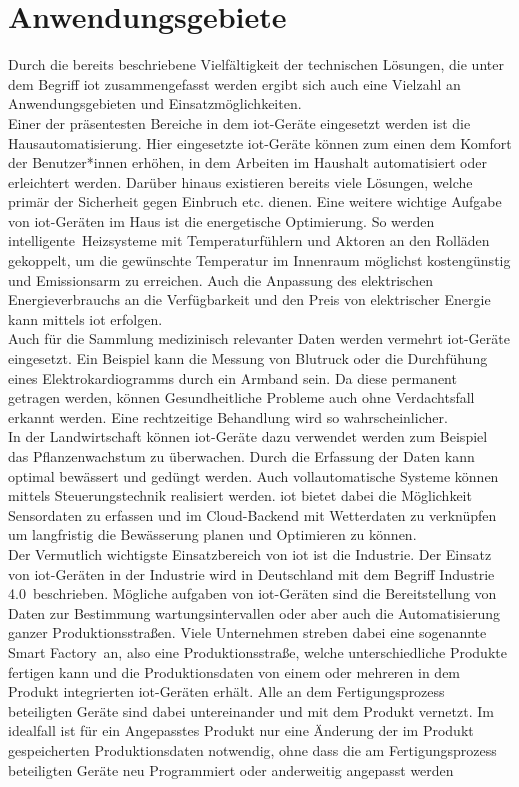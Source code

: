 \section{Anwendungsgebiete}\label{sec:3.2}
Durch die bereits beschriebene Vielfältigkeit der technischen Lösungen, die unter dem Begriff \acrshort{iot} zusammengefasst werden ergibt sich auch eine Vielzahl an Anwendungsgebieten und Einsatzmöglichkeiten.\\ Einer der präsentesten Bereiche in dem \acrshort{iot}-Geräte eingesetzt werden ist die Hausautomatisierung. Hier eingesetzte \acrshort{iot}-Geräte können zum einen dem Komfort der Benutzer*innen erhöhen, in dem Arbeiten im Haushalt automatisiert oder erleichtert werden. Darüber hinaus existieren bereits viele Lösungen, welche primär der Sicherheit gegen Einbruch etc. dienen. Eine weitere wichtige Aufgabe von \acrshort{iot}-Geräten im Haus ist die energetische Optimierung. So werden \glqq{}intelligente\grqq\ Heizsysteme mit Temperaturfühlern und Aktoren an den Rolläden gekoppelt, um die gewünschte Temperatur im Innenraum möglichst kostengünstig und Emissionsarm zu erreichen. Auch die Anpassung des elektrischen Energieverbrauchs an die Verfügbarkeit und den Preis von elektrischer Energie kann mittels \acrshort{iot} erfolgen\cite*[]{Zaheeruddin2020}.\\ Auch für die Sammlung medizinisch relevanter Daten werden vermehrt \acrshort{iot}-Geräte eingesetzt. Ein Beispiel kann die Messung von Blutruck oder die Durchfühung eines Elektrokardiogramms durch ein Armband sein. Da diese permanent getragen werden, können Gesundheitliche Probleme auch ohne Verdachtsfall erkannt werden. Eine rechtzeitige Behandlung wird so wahrscheinlicher\cite*[]{Zaheeruddin2020}.\\ In der Landwirtschaft können \acrshort{iot}-Geräte dazu verwendet werden zum Beispiel das Pflanzenwachstum zu überwachen. Durch die Erfassung der Daten kann optimal bewässert und gedüngt werden. Auch vollautomatische Systeme können mittels Steuerungstechnik realisiert werden. \acrshort{iot} bietet dabei die Möglichkeit Sensordaten zu erfassen und im \Gls{Cloud}-\Gls{Backend} mit Wetterdaten zu verknüpfen um langfristig die Bewässerung planen und Optimieren zu können\cite*[]{Zaheeruddin2020}.\\ Der Vermutlich wichtigste Einsatzbereich von \acrshort{iot} ist die Industrie. Der Einsatz von \acrshort{iot}-Geräten in der Industrie wird in Deutschland mit dem Begriff \glqq{}Industrie 4.0\grqq\ beschrieben. Mögliche aufgaben von \acrshort{iot}-Geräten sind die Bereitstellung von Daten zur Bestimmung wartungsintervallen oder aber auch die Automatisierung ganzer Produktionsstraßen. Viele Unternehmen streben dabei eine sogenannte \glqq{}Smart Factory\grqq\ an, also eine Produktionsstraße, welche unterschiedliche Produkte fertigen kann und die Produktionsdaten von einem oder mehreren in dem Produkt integrierten \acrshort{iot}-Geräten erhält. Alle an dem Fertigungsprozess beteiligten Geräte sind dabei untereinander und mit dem Produkt vernetzt. Im idealfall ist für ein Angepasstes Produkt nur eine Änderung der im Produkt gespeicherten Produktionsdaten notwendig, ohne dass die am Fertigungsprozess beteiligten Geräte neu Programmiert oder anderweitig angepasst werden 